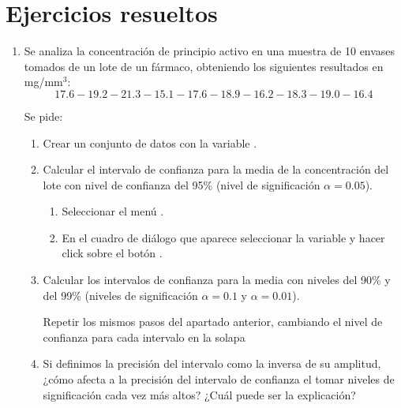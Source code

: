 \section{Ejercicios resueltos}
\begin{enumerate}[leftmargin=*]
\item  Se analiza la concentración de principio activo en una muestra de 10 envases tomados de un lote de un fármaco,
obteniendo los siguientes resultados en mg/mm$^{3}$:
\[
17.6-19.2-21.3-15.1-17.6-18.9-16.2-18.3-19.0-16.4
\]

Se pide:
\begin{enumerate}
\item  Crear un conjunto de datos con la variable .
\item  Calcular el intervalo de confianza para la media de la concentración del lote con nivel de confianza del 95\%
(nivel de significación $\alpha =0.05$).
\begin{indicacion}{
\begin{enumerate}
\item Seleccionar el menú .
\item En el cuadro de diálogo que aparece seleccionar la variable  y hacer click sobre el botón .
\end{enumerate}
}
\end{indicacion}

\item Calcular los intervalos de confianza para la media con niveles del 90\% y del 99\% (niveles de significación
$\alpha=0.1$ y $\alpha=0.01$).
\begin{indicacion}{
Repetir los mismos pasos del apartado anterior, cambiando el nivel de confianza para cada intervalo en la solapa 
}
\end{indicacion}

\item  Si definimos la precisión del intervalo como la inversa de su amplitud, ¿cómo afecta a la precisión del intervalo de confianza el
tomar niveles de significación cada vez más altos? ¿Cuál puede ser la explicación?


\end{enumerate}
\end{enumerate}

